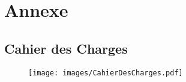 \newpage

\section{Annexe}


\subsection{Cahier des Charges}

%

\begin{figure}[!h]
	\centering
	\texttt{[image: images/CahierDesCharges.pdf]}
	\label{Cahier des charges}
\end{figure}